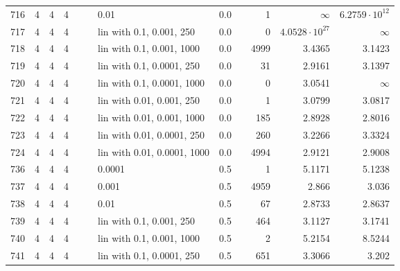 \begin{longtable}{lrrrrrlrrrrr}
  716 &       4 & 4 & 4 &   &   &                        0.01 &      0.0 &        &       1 &               $\infty$ &  $6.2759\cdot 10^{12}$ \\
  717 &       4 & 4 & 4 &   &   &    lin with 0.1, 0.001, 250 &      0.0 &        &       0 &  $4.0528\cdot 10^{27}$ &               $\infty$ \\
  718 &       4 & 4 & 4 &   &   &   lin with 0.1, 0.001, 1000 &      0.0 &        &    4999 &                 3.4365 &                 3.1423 \\
  719 &       4 & 4 & 4 &   &   &   lin with 0.1, 0.0001, 250 &      0.0 &        &      31 &                 2.9161 &                 3.1397 \\
  720 &       4 & 4 & 4 &   &   &  lin with 0.1, 0.0001, 1000 &      0.0 &        &       0 &                 3.0541 &               $\infty$ \\
  721 &       4 & 4 & 4 &   &   &   lin with 0.01, 0.001, 250 &      0.0 &        &       1 &                 3.0799 &                 3.0817 \\
  722 &       4 & 4 & 4 &   &   &  lin with 0.01, 0.001, 1000 &      0.0 &        &     185 &                 2.8928 &                 2.8016 \\
  723 &       4 & 4 & 4 &   &   &  lin with 0.01, 0.0001, 250 &      0.0 &        &     260 &                 3.2266 &                 3.3324 \\
  724 &       4 & 4 & 4 &   &   & lin with 0.01, 0.0001, 1000 &      0.0 &        &    4994 &                 2.9121 &                 2.9008 \\
  736 &       4 & 4 & 4 &   &   &                      0.0001 &      0.5 &        &       1 &                 5.1171 &                 5.1238 \\
  737 &       4 & 4 & 4 &   &   &                       0.001 &      0.5 &        &    4959 &                  2.866 &                  3.036 \\
  738 &       4 & 4 & 4 &   &   &                        0.01 &      0.5 &        &      67 &                 2.8733 &                 2.8637 \\
  739 &       4 & 4 & 4 &   &   &    lin with 0.1, 0.001, 250 &      0.5 &        &     464 &                 3.1127 &                 3.1741 \\
  740 &       4 & 4 & 4 &   &   &   lin with 0.1, 0.001, 1000 &      0.5 &        &       2 &                 5.2154 &                 8.5244 \\
  741 &       4 & 4 & 4 &   &   &   lin with 0.1, 0.0001, 250 &      0.5 &        &     651 &                 3.3066 &                  3.202 \\

\end{longtable}
